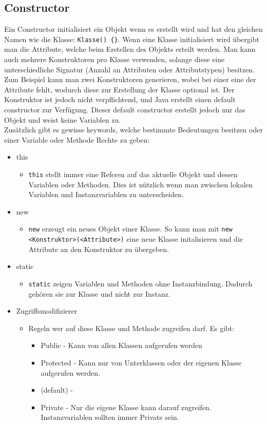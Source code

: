 \documentclass{article}
\begin{document}
	\subsection{Constructor}
	Ein Constructor initialisiert ein Objekt wenn es erstellt wird und hat den gleichen Namen wie die Klasse: \verb|Klasse() {}|. Wenn eine Klasse initialisiert wird übergibt man die Attribute, welche beim Erstellen des Objekts erteilt werden. Man kann auch mehrere Konstruktoren pro Klasse verwenden, solange diese eine unterschiedliche Signatur (Anzahl an Attributen oder Attributstypen) besitzen. Zum Beispiel kann man zwei Konstruktoren generieren, wobei bei einer eine der Attribute fehlt, wodurch diese zur Erstellung der Klasse optional ist. Der Konstruktor ist jedoch nicht verpflichtend, und Java erstellt einen default constructor zur Verfügung. Dieser default constructor erstellt jedoch nur das Objekt und weist keine Variablen zu. \\
	Zusätzlich gibt es gewisse keywords, welche bestimmte Bedeutungen besitzen oder einer Variable oder Methode Rechte zu geben:
	\begin{itemize}
		\item{this}
		\begin{itemize}
			\item{\verb|this| stellt immer eine Referen auf das aktuelle Objekt und dessen Variablen oder Methoden. Dies ist nützlich wenn man zwischen lokalen Variablen und Instanzvariablen zu unterscheiden.}
		\end{itemize}
		\item{new}
		\begin{itemize}
			\item{\verb|new| erzeugt ein neues Objekt einer Klasse. So kann man mit \verb|new <Konstruktor>(<Attribute>)| eine neue Klasse initalisieren und die Attribute an den Konstruktor zu übergeben.}
		\end{itemize}
		\item{static}
		\begin{itemize}
			\item{\verb|static| zeigen Variablen und Methoden ohne Instanzbindung. Dadurch gehören sie zur Klasse und nicht zur Instanz.}
		\end{itemize}
		\item{Zugriffsmodifizierer}
		\begin{itemize}
			\item{Regeln wer auf diese Klasse und Methode zugreifen darf. Es gibt:}
			\begin{itemize}
				\item{Public - Kann von allen Klassen aufgerufen werden}
				\item{Protected - Kann nur von Unterklassen oder der eigenen Klasse aufgerufen werden.}
				\item{(default) - }
				\item{Private - Nur die eigene Klasse kann darauf zugreifen. Instanzvariablen sollten immer Private sein.}
			\end{itemize}
		\end{itemize}
	\end{itemize}
\end{document}
